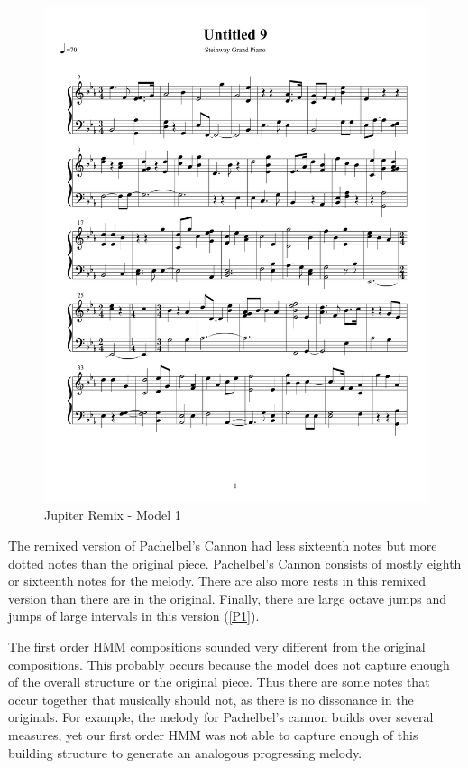 \documentclass{article} %
\begin{document}
\begin{figure}[H]
\centering

\includegraphics [scale = 0.6] {JupiterRemix-cropped.pdf}
\caption{Jupiter Remix - Model 1\label{J1}}
\end{figure}

The remixed version of Pachelbel's Cannon had less sixteenth notes but more dotted notes than the original piece. Pachelbel's Cannon consists of mostly eighth or sixteenth notes for the melody. There are also more rests in this remixed version than there are in the original. Finally, there are large octave jumps and jumps of large intervals in this version (\autoref{P1}).

The first order HMM compositions sounded very different from the original compositions. This probably occurs because the model does not capture enough of the overall structure or the original piece. Thus there are some notes that occur together that musically should not, as there is no dissonance in the originals. For example, the melody for Pachelbel's cannon builds over several measures, yet our first order HMM was not able to capture enough of this building structure to generate an analogous progressing melody. 
\end{document}
